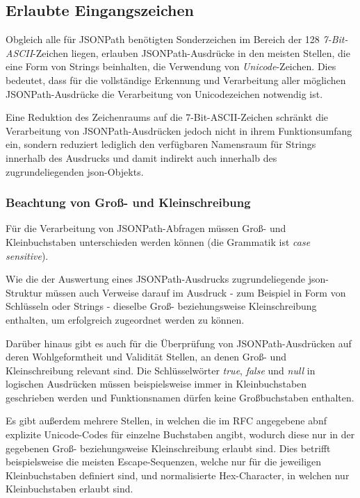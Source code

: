 \documentclass[oneside]{ausarbeitung}
\begin{document}
	
	
	
	\subsection{Erlaubte Eingangszeichen}
	
	Obgleich alle für JSONPath benötigten Sonderzeichen im Bereich der 128 \textit{7-Bit-ASCII}-Zeichen liegen, erlauben JSONPath-Ausdrücke in den meisten Stellen, die eine Form von Strings beinhalten, die Verwendung von \textit{Unicode}-Zeichen. Dies bedeutet, dass für die vollständige Erkennung und Verarbeitung aller möglichen JSONPath-Ausdrücke die Verarbeitung von Unicodezeichen notwendig ist.
	
	Eine Reduktion des Zeichenraums auf die 7-Bit-ASCII-Zeichen schränkt die Verarbeitung von JSONPath-Ausdrücken jedoch nicht in ihrem Funktionsumfang ein, sondern reduziert lediglich den verfügbaren Namensraum für Strings innerhalb des Ausdrucks und damit indirekt auch innerhalb des zugrundeliegenden \ac{json}-Objekts. 
	
	\subsubsection{Beachtung von Groß- und Kleinschreibung}
	
	Für die Verarbeitung von JSONPath-Abfragen müssen Groß- und Kleinbuchstaben unterschieden werden können (die Grammatik ist \textit{case sensitive}). 
	
	Wie die der Auswertung eines JSONPath-Ausdrucks zugrundeliegende \ac{json}-Struktur müssen auch Verweise darauf im Ausdruck - zum Beispiel in Form von Schlüsseln oder Strings - dieselbe Groß- beziehungsweise Kleinschreibung enthalten, um erfolgreich zugeordnet werden zu können. 
	
	Darüber hinaus gibt es auch für die Überprüfung von JSONPath-Ausdrücken auf deren Wohlgeformtheit und Validität Stellen, an denen Groß- und Kleinschreibung relevant sind. Die Schlüsselwörter \textit{true}, \textit{false} und \textit{null} in logischen Ausdrücken müssen beispielsweise immer in Kleinbuchstaben geschrieben werden und Funktionsnamen dürfen keine Großbuchstaben enthalten.
	
	Es gibt außerdem mehrere Stellen, in welchen die im RFC angegebene \ac{abnf} explizite Unicode-Codes für einzelne Buchstaben angibt, wodurch diese nur in der gegebenen Groß- beziehungsweise Kleinschreibung erlaubt sind. Dies betrifft beispielsweise die meisten Escape-Sequenzen, welche nur für die jeweiligen Kleinbuchstaben definiert sind, und normalisierte Hex-Character, in welchen nur Kleinbuchstaben erlaubt sind.
	
\end{document}
